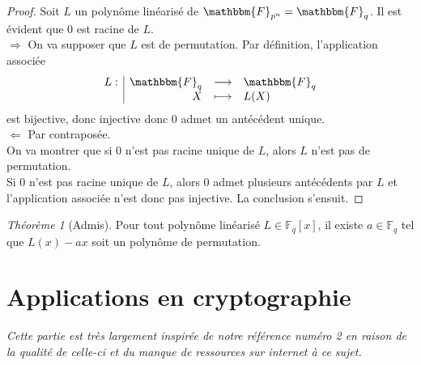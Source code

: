 \documentclass[12pt]{article}
\newcommand{\fonction}[5]{
\begin{displaymath}
\begin{array}{l|rcl}
\displaystyle
#1 : & #2 & \longrightarrow & #3 \\
    & #4 & \longmapsto & #5
\end{array}
\end{displaymath}
}
\theoremstyle{remark}\newtheorem{note}{Note}
\theoremstyle{remark}\newtheorem{nota}{Notation}
\newcommand{\Fq}{\mathbbm{F}_q}
\newtheorem{theorem}{Théorème}
\theoremstyle{definition}
\begin{document}
\begin{proof}
Soit $L$ un polynôme linéarisé de $\mathbbm{F}_{p^n} = \Fq$. Il est évident que $0$ est racine de $L$.\\
$\Rightarrow$ On va supposer que $L$ est de permutation. Par définition, l'application associée \fonction{L}{\Fq}{\Fq}{X}{L(X)} est bijective, donc injective donc $0$ admet un antécédent unique.\\

$\Leftarrow$ Par contraposée.\\
On va montrer que si $0$ n'est pas racine unique de $L$, alors $L$ n'est pas de permutation.\\
Si $0$ n'est pas racine unique de $L$, alors $0$ admet plusieurs antécédents par $L$ et l'application associée n'est donc pas injective. La conclusion s'ensuit.
\end{proof}

\begin{theorem}[Admis]
Pour tout polynôme linéarisé $L \in \mathbb{F}_q[x]$, il existe $a \in \mathbb{F}_q$ tel que $L(x) - ax$ soit un polynôme de permutation.
\end{theorem}



\pagebreak

\section{Applications en cryptographie}

\textsl{Cette partie est très largement inspirée de notre référence numéro 2 en raison de la qualité de celle-ci et du manque de ressources sur internet à ce sujet.}
\end{document}
